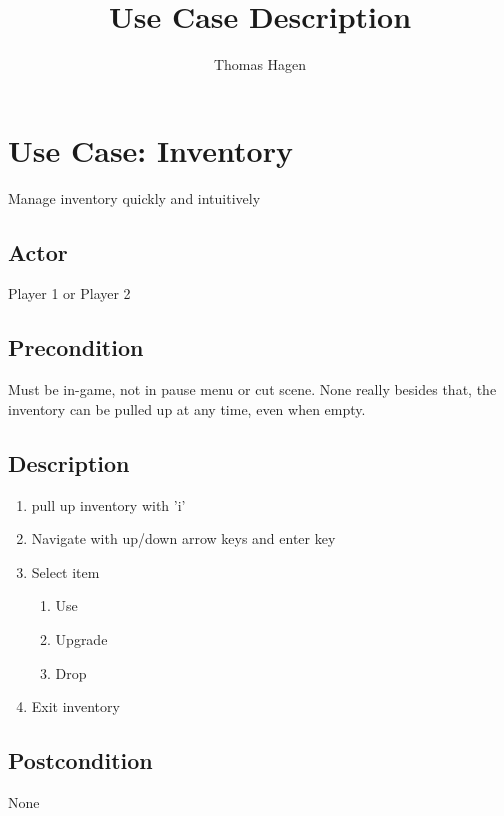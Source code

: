 \documentclass[11pt]{article}
\title{Use Case Description}
\author{Thomas Hagen}
\begin{document}
    \maketitle


    \section{Use Case: Inventory}
	Manage inventory quickly and intuitively


		\subsection{Actor}
			
			Player 1 or Player 2

		\subsection{Precondition}
		
			Must be in-game, not in pause menu or cut scene.
			None really besides that, the inventory can be pulled up at any time,
			even when empty.
 
		\subsection{Description}
			\begin{enumerate}
			\item pull up inventory with 'i'
			\item Navigate with up/down arrow keys and enter key
			\item Select item
			
				\begin{enumerate}
					\item Use
					\item Upgrade
					\item Drop
				\end{enumerate}
			\item Exit inventory
			\end{enumerate}

		\subsection{Postcondition}
		
			None

   
\end{document}
